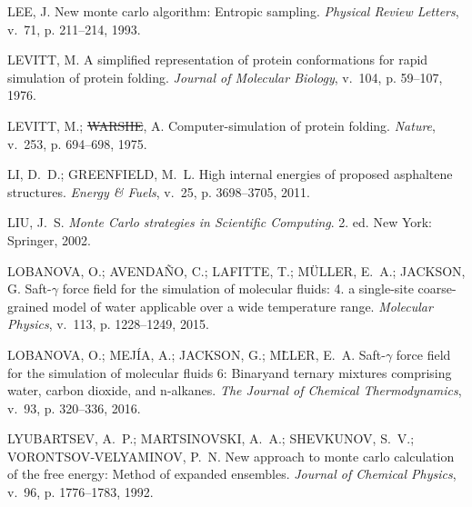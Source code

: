 \documentclass[
	12pt,				%
	openany,			%
	oneside,			%
	a4paper,			%
	english,			%
	brazil				%
	]{abntex2}
\providecommand{\DIFadd}[1]{{\protect\color{blue}\uwave{#1}}}
\providecommand{\DIFdel}[1]{{\protect\color{red}\sout{#1}}}
\providecommand{\DIFaddbegin}{}
\providecommand{\DIFaddend}{}
\providecommand{\DIFdelbegin}{}
\providecommand{\DIFdelend}{}
\providecommand{\DIFadd}[1]{{\protect\color{blue}\uwave{#1}}} %
\providecommand{\DIFdel}[1]{{\protect\color{red}\sout{#1}}}                      %
\providecommand{\DIFaddbegin}{} %
\providecommand{\DIFaddend}{} %
\providecommand{\DIFdelbegin}{} %
\providecommand{\DIFdelend}{} %
\begin{document}
\begin{thebibliography}{}
{LEE, J. New monte carlo algorithm: Entropic sampling.
\emph{Physical Review Letters}, v.~71, p. 211--214, 1993.}

{LEVITT, M. A simplified representation of protein conformations for rapid
  simulation of protein folding.
\emph{Journal of Molecular Biology}, v.~104, p. 59--107, 1976.}

\DIFdelbegin %
\DIFdelend \DIFaddbegin {}
\DIFaddend {LEVITT, M.; \DIFdelbegin \DIFdel{WARSHE}\DIFdelend \DIFaddbegin \DIFadd{WARSHEL}\DIFaddend , A. Computer-simulation of protein folding.
\emph{Nature}, v.~253, p. 694–698, 1975.}

{LI, D.~D.; GREENFIELD, M.~L. High internal energies of proposed asphaltene
  structures.
\emph{Energy \& Fuels}, v.~25, p. 3698--3705, 2011.}

{LIU, J.~S. \emph{Monte Carlo strategies in Scientific Computing}. 2. ed. New
  York: Springer, 2002.}

{LOBANOVA, O.; AVENDA{\~N}O, C.; LAFITTE, T.; M\"ULLER, E.~A.; JACKSON, G.
  Saft-$\gamma$ force field for the simulation of molecular fluids: 4. a
  single-site coarse-grained model of water applicable over a wide temperature
  range.
\emph{Molecular Physics}, v.~113, p. 1228–1249, 2015.}

{LOBANOVA, O.; MEJ\'IA, A.; JACKSON, G.; M\"LLER, E.~A. Saft-$\gamma$ force
  field for the simulation of molecular fluids 6: Binaryand ternary mixtures
  comprising water, carbon dioxide, and n-alkanes.
\emph{The Journal of Chemical Thermodynamics}, v.~93, p. 320–336, 2016.}

{LYUBARTSEV, A.~P.; MARTSINOVSKI, A.~A.; SHEVKUNOV, S.~V.;
  VORONTSOV‐VELYAMINOV, P.~N. New approach to monte carlo calculation of the
  free energy: Method of expanded ensembles.
\emph{Journal of Chemical Physics}, v.~96, p. 1776--1783, 1992.}


\end{thebibliography}
\end{document}
